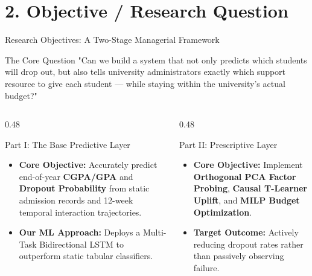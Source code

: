 \documentclass[aspectratio=169, 10pt]{beamer}
\begin{document}
\section{2. Objective / Research Question}

\begin{frame}{Research Objectives: A Two-Stage Managerial Framework}
  \begin{alertblock}{The Core Question}
    "Can we build a system that not only predicts which students will drop out, but also tells university administrators exactly which support resource to give each student — while staying within the university's actual budget?"
  \end{alertblock}
  \vspace{0.2cm}
  \begin{columns}[T]
    \begin{column}{0.48\textwidth}
      \begin{block}{Part I: The Base Predictive Layer}
        \begin{itemize}
          \item \textbf{Core Objective:} Accurately predict end-of-year \textbf{CGPA/GPA} and \textbf{Dropout Probability} from static admission records and 12-week temporal interaction trajectories.
          \item \textbf{Our ML Approach:} Deploys a Multi-Task Bidirectional LSTM to outperform static tabular classifiers.
        \end{itemize}
      \end{block}
    \end{column}
    \hfill
    \begin{column}{0.48\textwidth}
      \begin{block}{Part II: Prescriptive Layer}
        \begin{itemize}
          \item \textbf{Core Objective:} Implement \textbf{Orthogonal PCA Factor Probing}, \textbf{Causal T-Learner Uplift}, and \textbf{MILP Budget Optimization}.
          \item \textbf{Target Outcome:} Actively reducing dropout rates rather than passively observing failure.
        \end{itemize}
      \end{block}
    \end{column}
  \end{columns}
\end{frame}
\end{document}

